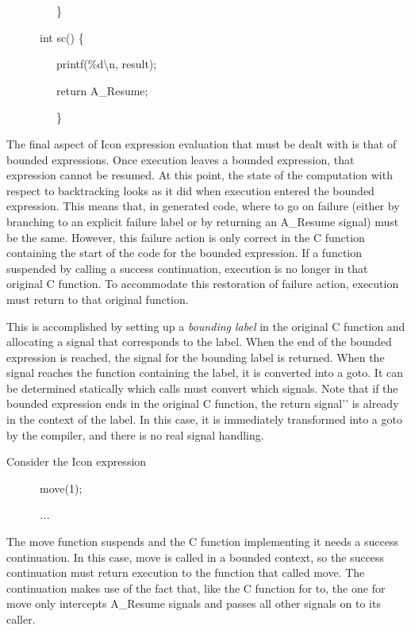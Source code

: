 {\ttfamily\mdseries
\ \ \ \ \ \ \ \ \ \}}

{\ttfamily\mdseries
\ \ \ \ \ \ int sc() \{}

{\ttfamily\mdseries
\ \ \ \ \ \ \ \ \ printf({\textquotedbl}\%d{\textbackslash}n{\textquotedbl}, result);}

{\ttfamily\mdseries
\ \ \ \ \ \ \ \ \ return A\_Resume;}

{\ttfamily\mdseries
\ \ \ \ \ \ \ \ \ \}}


The final aspect of Icon expression evaluation that must be dealt with
is that of bounded expressions. Once execution leaves a bounded
expression, that expression cannot be resumed. At this point, the
state of the computation with respect to backtracking looks as it did
when execution entered the bounded expression. This means that, in
generated code, where to go on failure (either by branching to an
explicit failure label or by returning an A\_Resume signal) must be
the same. However, this failure action is only correct in the C
function containing the start of the code for the bounded
expression. If a function suspended by calling a success continuation,
execution is no longer in that original C function. To accommodate
this restoration of failure action, execution must return to that
original function.

This is accomplished by setting up a \textit{bounding label} in the
original C function and allocating a signal that corresponds to the
label. When the end of the bounded expression is reached, the signal
for the bounding label is returned. When the signal reaches the
function containing the label, it is converted into a goto. It can be
determined statically which calls must convert which signals. Note
that if the bounded expression ends in the original C function, the
{\textasciigrave}{\textasciigrave}return signal'{}' is already in the
context of the label. In this case, it is immediately transformed into
a goto by the compiler, and there is no real signal handling.


Consider the Icon expression 

{\ttfamily\mdseries
\ \ \ \ \ \ move(1);}

{\ttfamily\mdseries
\ \ \ \ \ \ \textit{...}}


The move function suspends and the C function implementing it needs a
success continuation. In this case, move is called in a bounded
context, so the success continuation must return execution to the
function that called move. The continuation makes use of the fact
that, like the C function for to, the one for move only intercepts
A\_Resume signals and passes all other signals on to its caller.


